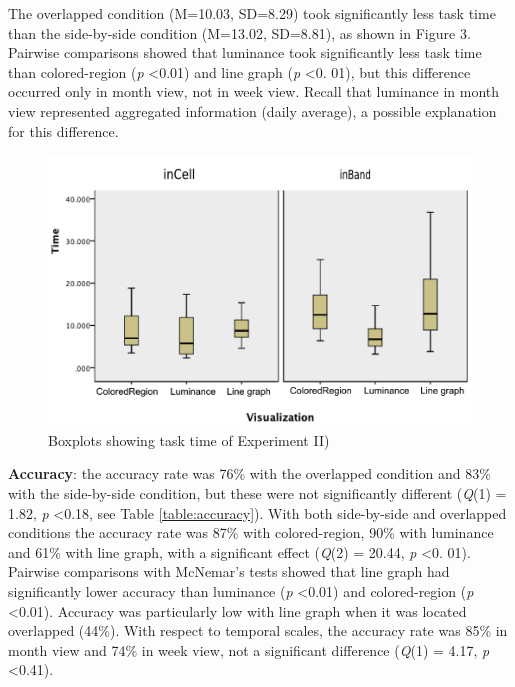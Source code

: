 \documentclass[12pt,oneside]{book}
\begin{document}
The overlapped condition (M=10.03, SD=8.29) took significantly less task time than the side-by-side condition (M=13.02, SD=8.81), as shown in Figure 3. Pairwise comparisons showed that luminance took significantly less task time than colored-region (\textit{p} \textless 0.01) and line graph (\textit{p} \textless 0. 01), but this difference occurred only in month view, not in week view. Recall that luminance in month view represented aggregated information (daily average), a possible explanation for this difference.

\begin{figure}[h]
\centering
\includegraphics[width=\columnwidth]{figures/lab_exp2}
\caption{Boxplots showing task time of Experiment II)}
\label{fig:lab_exp2}
\end{figure}

\textbf{Accuracy}:
the accuracy rate was 76\% with the overlapped condition and 83\% with the side-by-side condition, but these were not significantly different (\textit{Q}(1) = 1.82, \textit{p} \textless  0.18, see Table \ref{table:accuracy}). With both side-by-side and overlapped conditions the accuracy rate was 87\% with colored-region, 90\% with luminance and 61\% with line graph, with a significant effect (\textit{Q}(2) = 20.44, \textit{p} \textless  0. 01). Pairwise comparisons with McNemar's tests showed that line graph had significantly lower accuracy than luminance (\textit{p} \textless  0.01) and colored-region (\textit{p} \textless  0.01). Accuracy was particularly low with line graph when it was located overlapped (44\%). With respect to temporal scales, the accuracy rate was 85\% in month view and 74\% in week view, not a significant difference (\textit{Q}(1) = 4.17, \textit{p} \textless  0.41).
\end{document}
